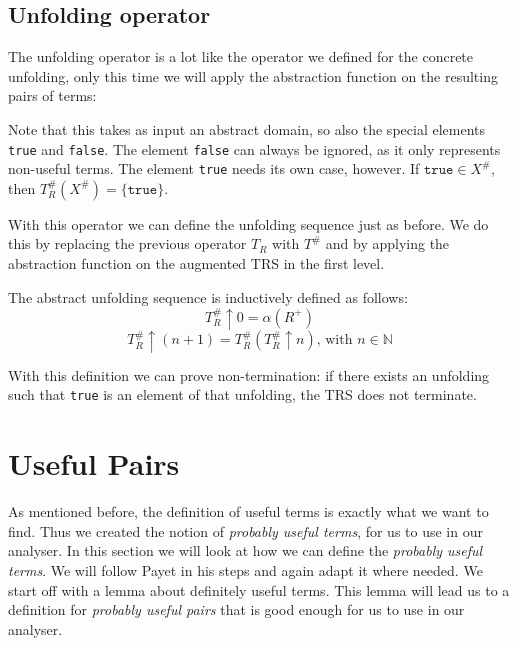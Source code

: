 \subsection*{Unfolding operator}
The unfolding operator is a lot like the operator we defined for the concrete unfolding, only this time we will apply the abstraction function on the resulting pairs of terms:

\begin{definition}
\label{def:abstunf}
\end{definition}
\begin{center}
\end{center}

Note that this takes as input an abstract domain, so also the special elements \texttt{true} and \texttt{false}. The element \texttt{false} can always be ignored, as it only represents non-useful terms. The element \texttt{true} needs its own case, however. If $\texttt{true} \in X^{\#}$, then $T_R^{\#}(X^{\#}) = \{ \texttt{true} \}$. 

With this operator we can define the unfolding sequence just as before. We do this by replacing the previous operator $T_R$ with $T^{\#}$ and by applying the abstraction function on the augmented TRS in the first level. 
\begin{definition}
The abstract unfolding sequence is inductively defined as follows:
$$T^{\#}_R \uparrow 0 = \alpha(R^+)$$
$$T^{\#}_R \uparrow (n+1) = T^{\#}_R(T^{\#}_R \uparrow n)\text{, with }n \in \mathbb{N}$$ 
\end{definition}

With this definition we can prove non-termination: if there exists an unfolding such that \texttt{true} is an element of that unfolding, the TRS does not terminate. 

\section*{Useful Pairs}
As mentioned before, the definition of useful terms is exactly what we want to find. Thus we created the notion of \textit{probably useful terms}, for us to use in our analyser. In this section we will look at how we can define the \textit{probably useful terms}. We will follow Payet in his steps and again adapt it where needed. We start off with a lemma about definitely useful terms. This lemma will lead us to a definition for \textit{probably useful pairs} that is good enough for us to use in our analyser. 

